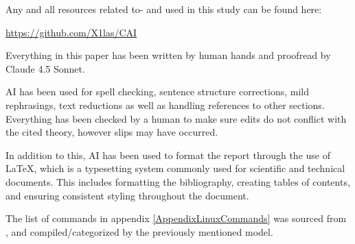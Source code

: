 Any and all resources related to- and used in this study can be found here:

\begin{center}
    \href{https://github.com/X1las/CAI}{https://github.com/X1las/CAI}
\end{center}

Everything in this paper has been written by human hands and proofread by Claude 4.5 Sonnet. 

AI has been used for spell checking, sentence structure corrections, mild rephrasings, text reductions as well as handling references to other sections. Everything has been checked by a human to make sure edits do not conflict with the cited theory, however slips may have occurred. 

In addition to this, AI has been used to format the report through the use of LaTeX, which is a typesetting system commonly used for scientific and technical documents. This includes formatting the bibliography, creating tables of contents, and ensuring consistent styling throughout the document.

The list of commands in appendix \ref{AppendixLinuxCommands} was sourced from \cite{CommandLineReference}, and compiled/categorized by the previously mentioned model. 
